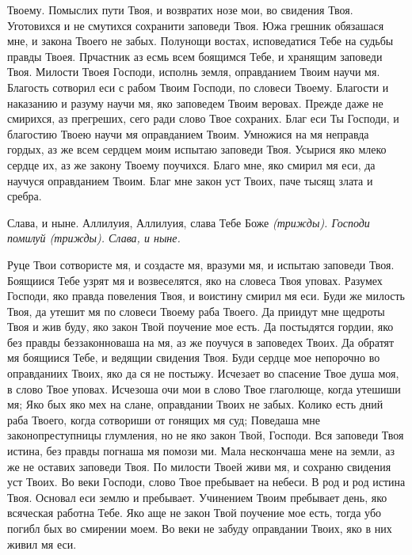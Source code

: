 Твоему. Помыслих пути Твоя, и возвратих нозе мои, во свидения Твоя. Уготовихся и не смутихся сохранити заповеди Твоя. Южа грешник обязашася мне, и закона Твоего не забых. Полунощи востах, исповедатися Тебе на судьбы правды Твоея. Прчастник аз есмь всем боящимся Тебе, и хранящим заповеди Твоя. Милости Твоея Господи, исполнь земля, оправданием Твоим научи мя. Благость сотворил еси с рабом Твоим Господи, по словеси Твоему. Благости и наказанию и разуму научи мя, яко заповедем Твоим веровах. Прежде даже не смирихся, аз прегреших, сего ради слово Твое сохраних. Благ еси Ты Господи, и благостию Твоею научи мя оправданием Твоим. Умножися на мя неправда гордых, аз же всем сердцем моим испытаю заповеди Твоя. Усырися яко млеко сердце их, аз же закону Твоему поучихся. Благо мне, яко смирил мя еси, да научуся оправданием Твоим. Благ мне закон уст Твоих, паче тысящ злата и сребра.


Слава, и ныне. Аллилуия, Аллилуия, слава Тебе Боже \itshape (трижды)\normalfont{}. Господи помилуй \itshape (трижды)\normalfont{}. Слава, и ныне.


Руце Твои сотвористе мя, и создасте мя, вразуми мя, и испытаю заповеди Твоя. Боящиися Тебе узрят мя и возвеселятся, яко на словеса Твоя уповах. Разумех Господи, яко правда повеления Твоя, и воистину смирил мя еси. Буди же милость Твоя, да утешит мя по словеси Твоему раба Твоего. Да приидут мне щедроты Твоя и жив буду, яко закон Твой поучение мое есть. Да постыдятся гордии, яко без правды беззаконноваша на мя, аз же поучуся в заповедех Твоих. Да обратят мя боящиися Тебе, и ведящии свидения Твоя. Буди сердце мое непорочно во оправданиих Твоих, яко да ся не постыжу. Исчезает во спасение Твое душа моя, в слово Твое уповах. Исчезоша очи мои в слово Твое глаголюще, когда утешиши мя; Яко бых яко мех на слане, оправдании Твоих не забых. Колико есть дний раба Твоего, когда сотвориши от гонящих мя суд; Поведаша мне законопреступницы глумления, но не яко закон Твой, Господи. Вся заповеди Твоя истина, без правды погнаша мя помози ми. Мала нескончаша мене на земли, аз же не оставих заповеди Твоя. По милости Твоей живи мя, и сохраню свидения уст Твоих. Во веки Господи, слово Твое пребывает на небеси. В род и род истина Твоя. Основал еси землю и пребывает. Учинением Твоим пребывает день, яко всяческая работна Тебе. Яко аще не закон Твой поучение мое есть, тогда убо погибл бых во смирении моем. Во веки не забуду оправдании Твоих, яко в них живил мя еси.


